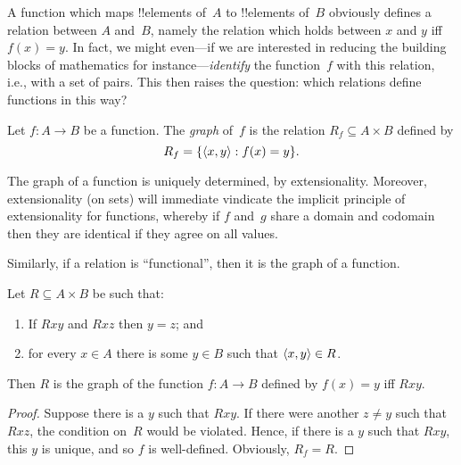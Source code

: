 \documentclass[../../../include/open-logic-section]{subfiles}
\begin{document}


\begin{explain} 
A function which maps !!{element}s of~$A$ to !!{element}s of~$B$
obviously defines a relation between $A$ and~$B$, namely the relation
which holds between $x$ and $y$ iff $f(x) = y$.  In fact, we might
even---if we are interested in reducing the building blocks of
mathematics for instance---\emph{identify} the function~$f$ with this
relation, i.e., with a set of pairs.  This then raises the question:
which relations define functions in this way?
\end{explain}

\begin{defn} Let $f\colon A \to B$ be a function.
The \emph{graph} of~$f$ is the relation $R_f \subseteq A \times B$
defined by
\[
R_f = \{ \langle x,y \rangle : f(x) = y \}.
\]
\end{defn}

\begin{explain}
The graph of a function is uniquely determined, by extensionality.
Moreover, extensionality (on sets) will immediate vindicate the
implicit principle of extensionality for functions,
whereby if $f$ and~$g$ share a domain and codomain then they are
identical if they agree on all values. 

Similarly, if a relation is ``functional'', then it is the graph of a function. 
\end{explain}

\begin{prop}
Let $R \subseteq A \times B$ be such that:
\begin{enumerate}
\item If $Rxy$ and $Rxz$ then $y = z$; and 
\item for every $x \in A$ there is some $y \in B$ such that $\langle x,
y \rangle \in R$.  
\end{enumerate}
Then $R$ is the graph of the function $f\colon A \to B$ defined by
$f(x) = y$ iff $Rxy$. 
\end{prop}

\begin{proof}
Suppose there is a $y$ such that $Rxy$.  If there were another $z \neq
y$ such that $Rxz$, the condition on~$R$ would be violated. Hence, if
there is a $y$ such that $Rxy$, this $y$ is unique, and so $f$ is
well-defined.  Obviously, $R_f = R$.
\end{proof}
\end{document}
